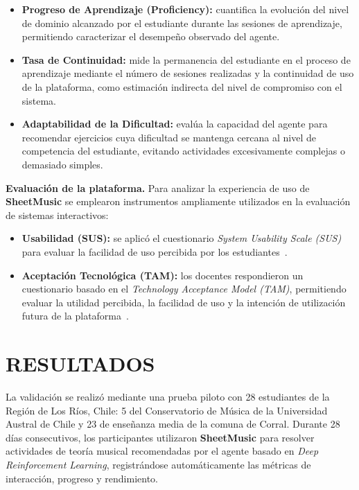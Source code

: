 \begin{itemize}

\item \textbf{Progreso de Aprendizaje (Proficiency):} cuantifica la evolución del nivel de dominio alcanzado por el estudiante durante las sesiones de aprendizaje, permitiendo caracterizar el desempeño observado del agente.

\item \textbf{Tasa de Continuidad:} mide la permanencia del estudiante en el proceso de aprendizaje mediante el número de sesiones realizadas y la continuidad de uso de la plataforma, como estimación indirecta del nivel de compromiso con el sistema.

\item \textbf{Adaptabilidad de la Dificultad:} evalúa la capacidad del agente para recomendar ejercicios cuya dificultad se mantenga cercana al nivel de competencia del estudiante, evitando actividades excesivamente complejas o demasiado simples.

\end{itemize}

\textbf{Evaluación de la plataforma.} Para analizar la experiencia de uso de \textbf{SheetMusic} se emplearon instrumentos ampliamente utilizados en la evaluación de sistemas interactivos:

\begin{itemize}

\item \textbf{Usabilidad (SUS):} se aplicó el cuestionario \textit{System Usability Scale (SUS)} para evaluar la facilidad de uso percibida por los estudiantes~\cite{sus_brooke_1996}.

\item \textbf{Aceptación Tecnológica (TAM):} los docentes respondieron un cuestionario basado en el \textit{Technology Acceptance Model (TAM)}, permitiendo evaluar la utilidad percibida, la facilidad de uso y la intención de utilización futura de la plataforma~\cite{davis1989}.

\end{itemize}

\section{RESULTADOS}

La validación se realizó mediante una prueba piloto con 28 estudiantes de la Región de Los Ríos, Chile: 5 del Conservatorio de Música de la Universidad Austral de Chile y 23 de enseñanza media de la comuna de Corral. Durante 28 días consecutivos, los participantes utilizaron \textbf{SheetMusic} para resolver actividades de teoría musical recomendadas por el agente basado en \textit{Deep Reinforcement Learning}, registrándose automáticamente las métricas de interacción, progreso y rendimiento.

